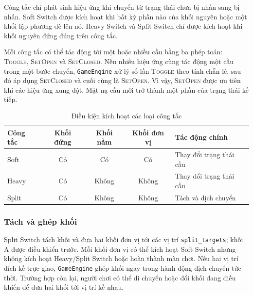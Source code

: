 Công tắc chỉ phát sinh hiệu ứng khi chuyển từ trạng thái chưa bị nhấn sang bị
nhấn. Soft Switch được kích hoạt khi bất kỳ phần nào của khối nguyên hoặc một
khối lập phương đè lên nó. Heavy Switch và Split Switch chỉ được kích hoạt khi
khối nguyên đứng đúng trên công tắc.

Mỗi công tắc có thể tác động tới một hoặc nhiều cầu bằng ba phép toán:
\textsc{Toggle}, \textsc{SetOpen} và \textsc{SetClosed}. Nếu nhiều hiệu ứng cùng
tác động một cầu trong một bước chuyển, \texttt{GameEngine} xử lý số lần
\textsc{Toggle} theo tính chẵn lẻ, sau đó áp dụng \textsc{SetClosed} và cuối
cùng là \textsc{SetOpen}. Vì vậy, \textsc{SetOpen} được ưu tiên khi các hiệu
ứng xung đột. Mặt nạ cầu mới trở thành một phần của trạng thái kế tiếp.

\begin{table}[H]
\centering
\caption{Điều kiện kích hoạt các loại công tắc}
\label{tab:switch-rules}
\small
\begin{tabular}{@{}lcccl@{}}
\toprule
\textbf{Công tắc} & \textbf{Khối đứng} & \textbf{Khối nằm} & \textbf{Khối đơn vị} & \textbf{Tác động chính} \\
\midrule
Soft & Có & Có & Có & Thay đổi trạng thái cầu \\
Heavy & Có & Không & Không & Thay đổi trạng thái cầu \\
Split & Có & Không & Không & Tách và dịch chuyển \\
\bottomrule
\end{tabular}
\end{table}

\subsubsection{Tách và ghép khối}

Split Switch tách khối và đưa hai khối đơn vị tới các vị trí
\texttt{split\_targets}; khối A được điều khiển trước. Mỗi khối đơn vị có thể
kích hoạt Soft Switch nhưng không kích hoạt Heavy/Split Switch hoặc hoàn thành
màn chơi. Nếu hai vị trí đích kề trực giao, \texttt{GameEngine} ghép khối ngay
trong hành động dịch chuyển tức thời. Trường hợp còn lại, người chơi có thể
di chuyển hoặc đổi khối đang điều khiển để đưa hai khối tới vị trí kề nhau.

